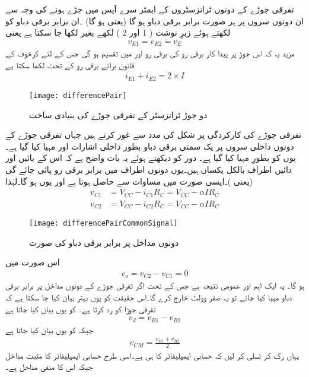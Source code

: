 تفرقی جوڑے کے دونوں ٹرانزسٹروں کے ایمٹر سرے آپس میں جڑے ہونے کی وجہ سے ان دونوں سروں پر ہر صورت برابر برقی دباو ہو گا (یعنی  ہو گا) ۔ان برابر برقی دباو کو لکھتے ہوئے  زیرِ نوشت ( 1 اور 2 ) لکھے بغیر  لکھا جا سکتا ہے یعنی
\begin{align}
v_{E1}=v_{E2}=v_E
\end{align}
مزید یہ کہ اس جوڑ پر پیدا  کار برقی رو کی برقی رو   اور  میں تقسیم ہو گی جس کے لئے کرخوف کے قانون برائے برقی رو کے تحت لکھا سکتا ہے
\begin{align} \label{مساوات_تفرقی_کل_رو_قطعی}
i_{E1}+i_{E2}=2 \times I
\end{align}
%
\begin{figure}
\centering
\texttt{[image: differencePair]}
\caption{دو جوڑ ٹرانزسٹر کے تفرقی جوڑے کی بنیادی ساخت}
\label{شکل_تفرقی_جوڑے_کی_بنیادی_ساخت}
\end{figure}
%
تفرقی جوڑے کی کارکردگی پر شکل  کی مدد سے غور کرتے ہیں جہاں تفرقی جوڑے کے دونوں داخلی سروں پر یک سمتی برقی دباو    بطور داخلی اشارات  اور   مہیا کیا گیا ہے۔یوں  کو بطورِ   مہیا کیا گیا ہے۔ دور کو دیکھتے ہوئے یہ بات واضح ہے کہ اس کے بائیں اور دائیں اطراف بالکل یکساں ہیں۔یوں دونوں اطراف میں برابر برقی رو پائی جائے گی (یعنی )۔ایسی صورت میں مساوات   سے    حاصل ہوتا ہے اور یوں  ہو گا۔لہٰذا
\begin{align*}
v_{C1}&=V_{CC}-i_{C1} R_C=V_{CC}-\alpha I R_C\\
v_{C2}&=V_{CC}-i_{C2}R_C=V_{CC}-\alpha I R_C
\end{align*}
%
\begin{figure}
\centering
\texttt{[image: differencePairCommonSignal]}
\caption{ دونوں مداخل پر برابر برقی دباو کی صورت}
\label{شکل_دونوں_مداخل_پر_برابر_برقی_دباو}
\end{figure}
اس صورت میں
\begin{align}
v_o=v_{C2}-v_{C1}=0
\end{align}
ہو گا۔ یہ ایک اہم اور عمومی نتیجہ ہے جس کے تحت اگر تفرقی جوڑے کے دونوں مداخل پر برابر برقی دباو مہیا کیا جائے تو یہ صفر وولٹ خارج کرے گا۔اس حقیقت کو یوں بہتر بیان کیا جا سکتا ہے کہ تفرقی جوڑا  کو رد کرتا ہے۔   کو یوں بیان کیا جاتا ہے
\begin{align}
v_d=v_{B1}-v_{B2}
\end{align}
جبکہ   کو یوں بیان کیا جاتا ہے
\begin{align}
v_{CM}=\frac{v_{B1}+v_{B2}}{2}
\end{align}
یہاں رک کر تسلی کر لیں کہ  حسابی ایمپلیفائر کا  ہی ہے۔اسی طرح   حسابی ایمپلیفائر کا مثبت مداخل جبکہ   اس کا منفی  مداخل ہے۔

